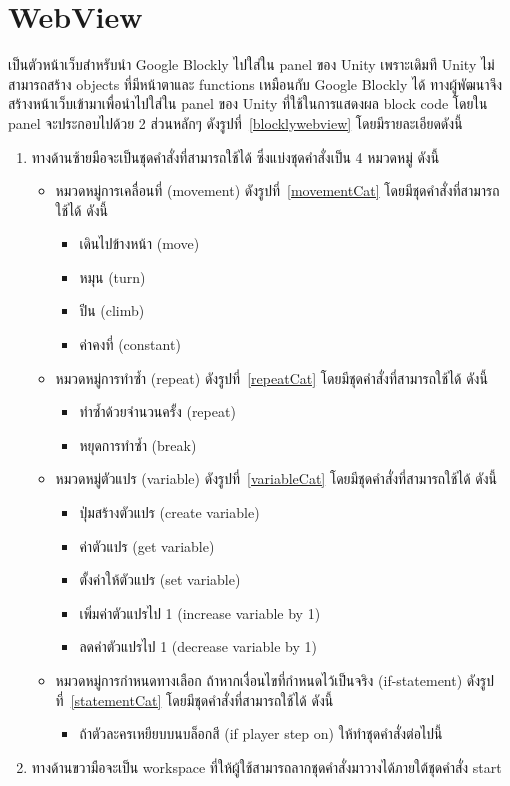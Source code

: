 \section{WebView}
เป็นตัวหน้าเว็บสำหรับนำ Google Blockly ไปใส่ใน panel ของ Unity เพราะเดิมที Unity ไม่สามารถสร้าง objects ที่มีหน้าตาและ functions เหมือนกับ Google Blockly ได้ ทางผู้พัฒนาจึงสร้างหน้าเว็บเข้ามาเพื่อนำไปใส่ใน 
panel ของ Unity ที่ใช้ในการแสดงผล block code โดยใน panel จะประกอบไปด้วย 2 ส่วนหลักๆ ดังรูปที่~\ref{blocklywebview} โดยมีรายละเอียดดังนี้
\begin{enumerate}
    \item ทางด้านซ้ายมือจะเป็นชุดคำสั่งที่สามารถใช้ได้ ซึ่งแบ่งชุดคำสั่งเป็น 4 หมวดหมู่ ดังนี้
    \begin{itemize}
        \item หมวดหมู่การเคลื่อนที่ (movement) ดังรูปที่~\ref{movementCat} โดยมีชุดคำสั่งที่สามารถใช้ได้ ดังนี้
        \begin{itemize}
            \item เดินไปข้างหน้า (move)
            \item หมุน (turn)
            \item ปีน (climb)
            \item ค่าคงที่ (constant)
        \end{itemize}
        \item หมวดหมู่การทำซ้ำ (repeat) ดังรูปที่~\ref{repeatCat} โดยมีชุดคำสั่งที่สามารถใช้ได้ ดังนี้
        \begin{itemize}
            \item ทำซ้ำด้วยจำนวนครั้ง (repeat)
            \item หยุดการทำซ้ำ (break)
        \end{itemize}
        \item หมวดหมู่ตัวแปร (variable) ดังรูปที่~\ref{variableCat} โดยมีชุดคำสั่งที่สามารถใช้ได้ ดังนี้
        \begin{itemize}
            \item ปุ่มสร้างตัวแปร (create variable)
            \item ค่าตัวแปร (get variable)
            \item ตั้งค่าให้ตัวแปร (set variable)
            \item เพิ่มค่าตัวแปรไป 1 (increase variable by 1)
            \item ลดค่าตัวแปรไป 1 (decrease variable by 1)
        \end{itemize}
        \item หมวดหมู่การกำหนดทางเลือก ถ้าหากเงื่อนไขที่กำหนดไว้เป็นจริง (if-statement) ดังรูปที่~\ref{statementCat} โดยมีชุดคำสั่งที่สามารถใช้ได้ ดังนี้
        \begin{itemize}
            \item ถ้าตัวละครเหยียบบนบล็อกสี (if player step on) ให้ทำชุดคำสั่งต่อไปนี้
        \end{itemize}
    \end{itemize}
    \item ทางด้านขวามือจะเป็น workspace ที่ให้ผู้ใช้สามารถลากชุดคำสั่งมาวางได้ภายใต้ชุดคำสั่ง start
\end{enumerate}

